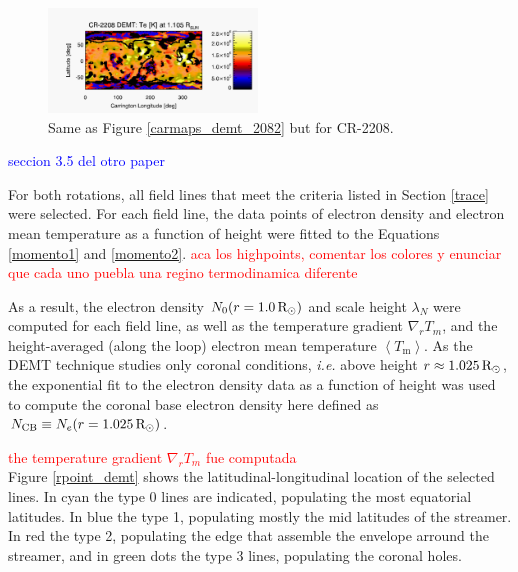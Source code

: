 \documentclass[namedreferences]{solarphysics}
\newcommand{\mrsun}{{\rm R_\odot}}
\newcommand{\lN}{\lambda_N}
\newcommand{\NCB}{N_{\rm CB}}
\newcommand{\aTm}{\left< T_\textrm{m}\right>}
\begin{document}
\begin{article}
\begin{figure}[h!]
\begin{center}
\includegraphics[width=0.495\textwidth]{figs/map_Tm_CR2208_DEMT-AIA_H1_L522_r3d_1105_Rsun.pdf}
\caption{Same as Figure \ref{carmaps_demt_2082} but for CR-2208.}
\label{carmaps_demt_2208}
\end{center}
\end{figure}



\textcolor{blue}{seccion 3.5 del otro paper}

For both rotations, all field lines that meet the criteria listed in Section \ref{trace} were selected. For each field line, the data points of electron density and electron mean temperature as a function of height were fitted to the Equations \ref{momento1} and \ref{momento2}.
\textcolor{red}{aca los highpoints, comentar los colores y enunciar que cada uno puebla una regino termodinamica diferente}


 As a result, the electron density $N_0(r=1.0\,\mrsun)$ and scale height $\lN$ were computed for each field line, as well as the temperature gradient $\nabla_r T_m$, and the height-averaged (along the loop) electron mean temperature $\aTm$. As the DEMT technique studies only coronal conditions, \textit{i.e.} above height $r\approx 1.025\,\mrsun$, the exponential fit to the electron density data as a function of height was used to compute the coronal base electron density here defined as $\NCB\equiv N_e(r=1.025\,\mrsun)$. 

\textcolor{red}{the temperature gradient $\nabla_r T_m$ fue computada}\\
Figure \ref{rpoint_demt} shows the latitudinal-longitudinal location of the selected lines. In cyan the type 0 lines are indicated, populating the most equatorial latitudes. In blue the type 1, populating mostly the mid latitudes  of the streamer. In red the type 2, populating the edge that assemble the envelope arround the streamer, and in green dots the type 3 lines, populating the coronal holes.



\end{article}
\end{document}
